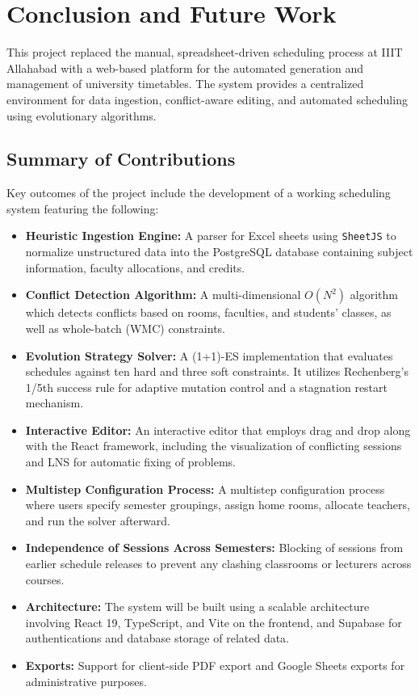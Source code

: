 
\chapter{Conclusion and Future Work} %

\label{Chapter6} %


This project replaced the manual, spreadsheet-driven scheduling process at IIIT Allahabad with a web-based platform for the automated generation and management of university timetables. The system provides a centralized environment for data ingestion, conflict-aware editing, and automated scheduling using evolutionary algorithms.
\section{Summary of Contributions}

Key outcomes of the project include the development of a working scheduling system featuring the following:
\begin{itemize}
    \item \textbf{Heuristic Ingestion Engine:} A parser for Excel sheets using \texttt{SheetJS} to normalize unstructured data into the PostgreSQL database containing subject information, faculty allocations, and credits.
    \item \textbf{Conflict Detection Algorithm:} A multi-dimensional $O(N^2)$ algorithm which detects conflicts based on rooms, faculties, and students' classes, as well as whole-batch (WMC) constraints.  \item \textbf{Evolution Strategy Solver:} A (1+1)-ES implementation that evaluates schedules against ten hard and three soft constraints. It utilizes Rechenberg's 1/5th success rule for adaptive mutation control and a stagnation restart mechanism.
    \item \textbf{Interactive Editor:} An interactive editor that employs drag and drop along with the React framework, including the visualization of conflicting sessions and LNS for automatic fixing of problems.
    \item \textbf{Multistep Configuration Process:} A multistep configuration process where users specify semester groupings, assign home rooms, allocate teachers, and run the solver afterward.
   \item \textbf{Independence of Sessions Across Semesters:} Blocking of sessions from earlier schedule releases to prevent any clashing classrooms or lecturers across courses.    
\item \textbf{Architecture:} The system will be built using a scalable architecture involving React 19, TypeScript, and Vite on the frontend, and Supabase for authentications and database storage of related data.
\item \textbf{Exports:} Support for client-side PDF export and Google Sheets exports for administrative purposes.\end{itemize}

